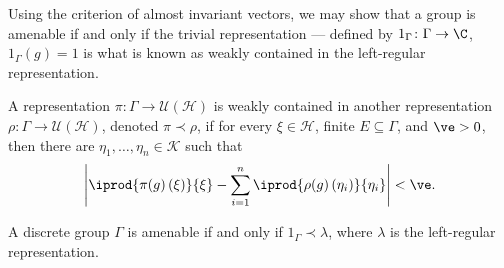 \documentclass[10pt]{mypackage}
\begin{document}
Using the criterion of almost invariant vectors, we may show that a group is amenable if and only if the trivial representation --- defined by $1_{\Gamma}\colon \Gamma\rightarrow \C$, $1_{\Gamma}(g) = 1$ is what is known as weakly contained in the left-regular representation.\newline

A representation $\pi\colon \Gamma\rightarrow \mathcal{U}\left(\mathcal{H}\right)$ is weakly contained in another representation $\rho\colon \Gamma\rightarrow \mathcal{U}\left(\mathcal{H}\right)$, denoted $\pi\prec \rho$, if for every $\xi\in \mathcal{H}$, finite $E\subseteq \Gamma$, and $\ve > 0$, then there are $\eta_1,\dots,\eta_n\in \mathcal{K}$ such that
\begin{align*}
  \left\vert \iprod{\pi(g)\left(\xi\right)}{\xi} - \sum_{i=1}^{n} \iprod{\rho(g)\left(\eta_i\right)}{\eta_i} \right\vert < \ve.
\end{align*}
\begin{theorem}
  A discrete group $\Gamma$ is amenable if and only if $1_{\Gamma}\prec \lambda$, where $\lambda$ is the left-regular representation.
\end{theorem}
\end{document}

